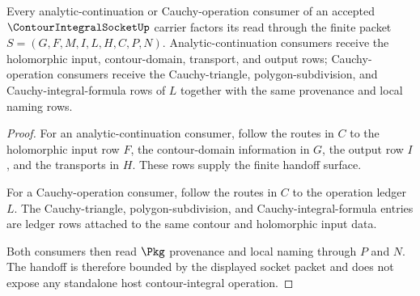 \begin{theorem}
\label{thm:contour-integral-socket-handoff}
Every analytic-continuation or Cauchy-operation consumer of an accepted $\ContourIntegralSocketUp$ carrier factors its read through the finite packet $S=(G,F,M,I,L,H,C,P,N)$. Analytic-continuation consumers receive the holomorphic input, contour-domain, transport, and output rows; Cauchy-operation consumers receive the Cauchy-triangle, polygon-subdivision, and Cauchy-integral-formula rows of $L$ together with the same provenance and local naming rows.
\end{theorem}
\begin{proof}
For an analytic-continuation consumer, follow the routes in $C$ to the holomorphic input row $F$, the contour-domain information in $G$, the output row $I$, and the transports in $H$. These rows supply the finite handoff surface.

For a Cauchy-operation consumer, follow the routes in $C$ to the operation ledger $L$. The Cauchy-triangle, polygon-subdivision, and Cauchy-integral-formula entries are ledger rows attached to the same contour and holomorphic input data.

Both consumers then read $\Pkg$ provenance and local naming through $P$ and $N$. The handoff is therefore bounded by the displayed socket packet and does not expose any standalone host contour-integral operation.
\end{proof}

